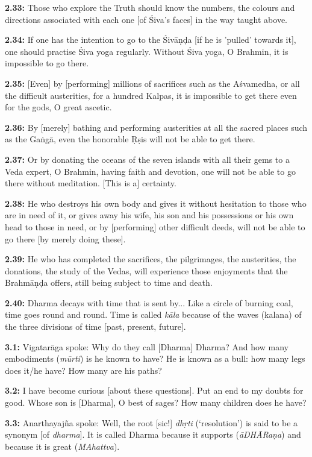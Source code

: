 \documentclass{article}
\newcommand{\vsnum}[1]{\textbf{#1}}
\newcommand{\skt}[1]{\textit{#1}}
\begin{document}
\vsnum{2.33: }Those who explore the Truth should know the numbers, the colours and directions associated with each one [of Śiva's faces] in the way taught above.

\vsnum{2.34: }If one has the intention to go to the Śivāṇḍa [if he is 'pulled' towards it], one should practise Śiva yoga regularly. Without Śiva yoga, O Brahmin, it is impossible to go there.

\vsnum{2.35: }[Even] by [performing] millions of sacrifices such as the Aśvamedha, or all the difficult austerities, for a hundred Kalpas, it is impossible to get there even for the gods, O great ascetic.

\vsnum{2.36: }By [merely] bathing and performing austerities at all the sacred places such as the Gaṅgā, even the honorable Ṛṣis will not be able to get there.

\vsnum{2.37: }Or by donating the oceans of the seven islands with all their gems to a Veda expert, O Brahmin, having faith and devotion, one will not be able to go there without meditation. [This is a] certainty.

\vsnum{2.38: }He who destroys his own body and gives it without hesitation to those who are in need of it, or gives away his wife, his son and his possessions or his own head to those in need, or by [performing] other difficult deeds, will not be able to go there [by merely doing these].

\vsnum{2.39: }He who has completed the sacrifices, the pilgrimages, the austerities, the donations, the study of the Vedas, will experience those enjoyments that the Brahmāṇḍa offers, still being subject to time and death.

\vsnum{2.40: }Dharma decays with time that is sent by... Like a circle of burning coal, time goes round and round. Time is called \skt{kāla} because of the waves (kalana) of the three divisions of time [past, present, future].


\vsnum{3.1: }Vigatarāga spoke: Why do they call [Dharma] Dharma? And how many embodiments (\skt{mūrti}) is he known to have? He is known as a bull: how many legs does it/he have? How many are his paths?

\vsnum{3.2: }I have become curious [about these questions]. Put an end to my doubts for good. Whose son is [Dharma], O best of sages? How many children does he have?

\vsnum{3.3: }Anarthayajña spoke: Well, the root [sic!] \skt{dhṛti} (`resolution') is said to be a synonym [of \skt{dharma}]. It is called Dharma because it supports (\skt{āDHĀRaṇa}) and because it is great (\skt{MAhattva}).
\end{document}
